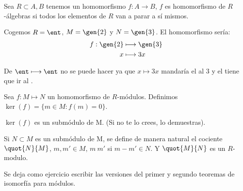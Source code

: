 \begin{defn}
	Sea $R\subset A,B$ tenemos un homomorfismo $f: A \rightarrow B$, $f$ es homomorfismo de $R$-álgebras si todos los elementos de $R$ van a parar a sí mismos.
\end{defn}

\begin{example}
	Cogemos $R= \ent$, $M=\gen{2}$ y $N=\gen{3}$. El homomorfismo sería:
	\begin{align*}
		f: \gen{2} & \longmapsto  \gen{3}\\
		x & \longmapsto 3x \\
	\end{align*}


	\obs De $\ent \longmapsto \ent$ no se puede hacer ya que $x \longmapsto 3x$ mandaría el \one al 3 y el \one tiene que ir al \one.
\end{example}

\begin{defn}
	Sea $f:M \longmapsto N$ un homomorfismo de $R$-módulos. Definimos $\ker(f)=\{ m\in M:f(m)=0 \}$.
\end{defn}

\obs $\ker(f)$ es un submódulo de M. (Si no te lo crees, lo demuestras).

\begin{defn}
Si $N \subset M$ es un submódulo de M, se define de manera natural el cociente $\quot{N}{M}$, $m,m' \in M$, $m~m'$ si $m-m' \in N$. Y $\quot{M}{N}$ es un $R$-modulo.
\end{defn}

Se deja como ejercicio escribir las versiones del primer y segundo teoremas de isomorfía para módulos.

